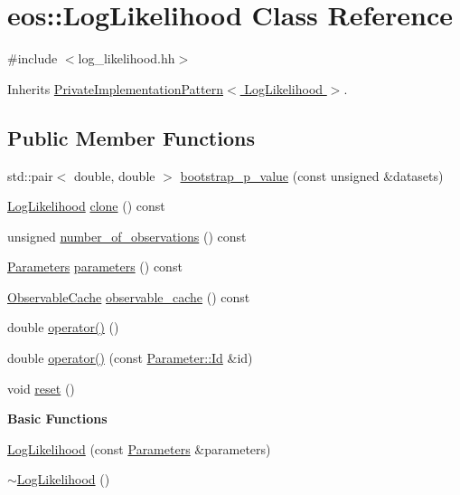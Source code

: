 \hypertarget{classeos_1_1LogLikelihood}{
\section{eos::LogLikelihood Class Reference}
\label{classeos_1_1LogLikelihood}
}


{\ttfamily \#include $<$log\_\-likelihood.hh$>$}

Inherits \hyperlink{classeos_1_1PrivateImplementationPattern}{PrivateImplementationPattern$<$ LogLikelihood $>$}.\subsection*{Public Member Functions}
\begin{DoxyCompactItemize}
\item 
std::pair$<$ double, double $>$ \hyperlink{classeos_1_1LogLikelihood_a51cd04019887511f540be75b4ef9ec7a}{bootstrap\_\-p\_\-value} (const unsigned \&datasets)
\item 
\hyperlink{classeos_1_1LogLikelihood}{LogLikelihood} \hyperlink{classeos_1_1LogLikelihood_a0aed658b79b9915a79ceba3a2fe10509}{clone} () const 
\item 
unsigned \hyperlink{classeos_1_1LogLikelihood_af9fe6dbe66c827e44bc500d3f2a94a6a}{number\_\-of\_\-observations} () const 
\item 
\hyperlink{classeos_1_1Parameters}{Parameters} \hyperlink{classeos_1_1LogLikelihood_abf5c017096b99502c3bafb47a6297852}{parameters} () const 
\item 
\hyperlink{classeos_1_1ObservableCache}{ObservableCache} \hyperlink{classeos_1_1LogLikelihood_a3dc64fa5ee57da08f90eb18acd5bb8dd}{observable\_\-cache} () const 
\item 
double \hyperlink{classeos_1_1LogLikelihood_a3852b27cbc7bc0254c9323dfedf31576}{operator()} ()
\item 
double \hyperlink{classeos_1_1LogLikelihood_a289c5a378c31d4d05f4dc04af256cc84}{operator()} (const \hyperlink{classeos_1_1Parameter_a065f55e66b2128cc5f14339e676d833a}{Parameter::Id} \&id)
\item 
void \hyperlink{classeos_1_1LogLikelihood_a43d24e99c8f7e4209e6bb763186123d8}{reset} ()
\end{DoxyCompactItemize}
\begin{Indent}{\bf Basic Functions}\par
{\em \label{_amgrp2386c9a1f1785edee33f374dd2db9b3d}
 }\begin{DoxyCompactItemize}
\item 
\hyperlink{classeos_1_1LogLikelihood_aaa2ab4108cc72397704139e01aca6316}{LogLikelihood} (const \hyperlink{classeos_1_1Parameters}{Parameters} \&parameters)
\item 
\hyperlink{classeos_1_1LogLikelihood_ad6f6ff2a71df17599e033681d64fe454}{$\sim$LogLikelihood} ()
\end{DoxyCompactItemize}
\end{Indent}
